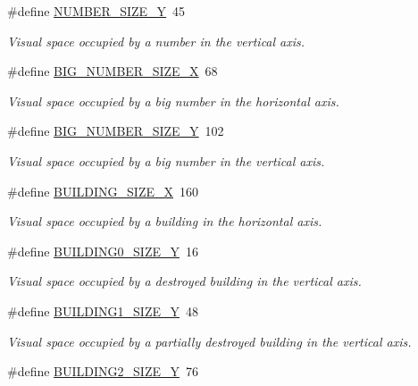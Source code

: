 \begin{DoxyCompactItemize}
\#define \hyperlink{group___b_m_ps_holder_gad70760092071deb462db0dc776795028}{N\+U\+M\+B\+E\+R\+\_\+\+S\+I\+Z\+E\+\_\+Y}~45
\begin{DoxyCompactList}\small\item\em Visual space occupied by a number in the vertical axis. \end{DoxyCompactList}\item 
\#define \hyperlink{group___b_m_ps_holder_gaf100aba6100fd8859da0ec78d1e8060f}{B\+I\+G\+\_\+\+N\+U\+M\+B\+E\+R\+\_\+\+S\+I\+Z\+E\+\_\+X}~68
\begin{DoxyCompactList}\small\item\em Visual space occupied by a big number in the horizontal axis. \end{DoxyCompactList}\item 
\#define \hyperlink{group___b_m_ps_holder_ga842fcaf13f4ff9ffef8a2cdbd78d3924}{B\+I\+G\+\_\+\+N\+U\+M\+B\+E\+R\+\_\+\+S\+I\+Z\+E\+\_\+Y}~102
\begin{DoxyCompactList}\small\item\em Visual space occupied by a big number in the vertical axis. \end{DoxyCompactList}\item 
\#define \hyperlink{group___b_m_ps_holder_ga55978cc77704142c71897311f71d7029}{B\+U\+I\+L\+D\+I\+N\+G\+\_\+\+S\+I\+Z\+E\+\_\+X}~160
\begin{DoxyCompactList}\small\item\em Visual space occupied by a building in the horizontal axis. \end{DoxyCompactList}\item 
\#define \hyperlink{group___b_m_ps_holder_gadeef9f42a1337cc1b6bb5748b3a34e59}{B\+U\+I\+L\+D\+I\+N\+G0\+\_\+\+S\+I\+Z\+E\+\_\+Y}~16
\begin{DoxyCompactList}\small\item\em Visual space occupied by a destroyed building in the vertical axis. \end{DoxyCompactList}\item 
\#define \hyperlink{group___b_m_ps_holder_gafdf1660eb5aa651aab3f7fcae454e7df}{B\+U\+I\+L\+D\+I\+N\+G1\+\_\+\+S\+I\+Z\+E\+\_\+Y}~48
\begin{DoxyCompactList}\small\item\em Visual space occupied by a partially destroyed building in the vertical axis. \end{DoxyCompactList}\item 
\#define \hyperlink{group___b_m_ps_holder_ga79b5fabee93603f59aae8533c5058326}{B\+U\+I\+L\+D\+I\+N\+G2\+\_\+\+S\+I\+Z\+E\+\_\+Y}~76

\end{DoxyCompactItemize}
